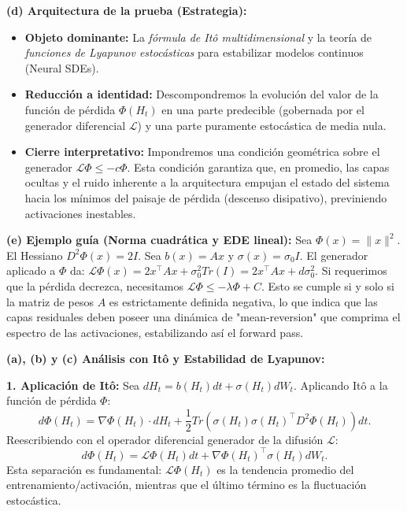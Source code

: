 \documentclass[11pt, letterpaper]{article}
\begin{document}
\begin{solucion}
    \textbf{(d) Arquitectura de la prueba (Estrategia):}
    \begin{itemize}
        \item[(i)] \textbf{Objeto dominante:} La \textit{fórmula de Itô multidimensional} y la teoría de \textit{funciones de Lyapunov estocásticas} para estabilizar modelos continuos (Neural SDEs).
        \item[(ii)] \textbf{Reducción a identidad:} Descompondremos la evolución del valor de la función de pérdida $\Phi(H_t)$ en una parte predecible (gobernada por el generador diferencial $\mathcal{L}$) y una parte puramente estocástica de media nula.
        \item[(iii)] \textbf{Cierre interpretativo:} Impondremos una condición geométrica sobre el generador $\mathcal{L}\Phi \le -c\Phi$. Esta condición garantiza que, en promedio, las capas ocultas y el ruido inherente a la arquitectura empujan el estado del sistema hacia los mínimos del paisaje de pérdida (descenso disipativo), previniendo activaciones inestables.
    \end{itemize}

    \vspace{3mm}
    \textbf{(e) Ejemplo guía (Norma cuadrática y EDE lineal):}
    Sea $\Phi(x) = \|x\|^2$. El Hessiano $D^2\Phi(x) = 2I$. 
    Sea $b(x) = Ax$ y $\sigma(x) = \sigma_0 I$.
    El generador aplicado a $\Phi$ da: $\mathcal{L}\Phi(x) = 2x^\top A x + \sigma_0^2 Tr(I) = 2x^\top A x + d\sigma_0^2$.
    Si requerimos que la pérdida decrezca, necesitamos $\mathcal{L}\Phi \le -\lambda \Phi + C$. Esto se cumple si y solo si la matriz de pesos $A$ es estrictamente definida negativa, lo que indica que las capas residuales deben poseer una dinámica de "mean-reversion" que comprima el espectro de las activaciones, estabilizando así el forward pass.

    \textbf{(a), (b) y (c) Análisis con Itô y Estabilidad de Lyapunov:}

    \textbf{1. Aplicación de Itô:}
    Sea $dH_t = b(H_t)dt + \sigma(H_t)dW_t$. Aplicando Itô a la función de pérdida $\Phi$:
    \[ d\Phi(H_t) = \nabla\Phi(H_t) \cdot dH_t + \frac{1}{2} Tr\left( \sigma(H_t)\sigma(H_t)^\top D^2\Phi(H_t) \right) dt. \]
    Reescribiendo con el operador diferencial generador de la difusión $\mathcal{L}$:
    \[ d\Phi(H_t) = \mathcal{L}\Phi(H_t) dt + \nabla\Phi(H_t)^\top \sigma(H_t) dW_t. \]
    Esta separación es fundamental: $\mathcal{L}\Phi(H_t)$ es la tendencia promedio del entrenamiento/activación, mientras que el último término es la fluctuación estocástica.


\end{solucion}
\end{document}
